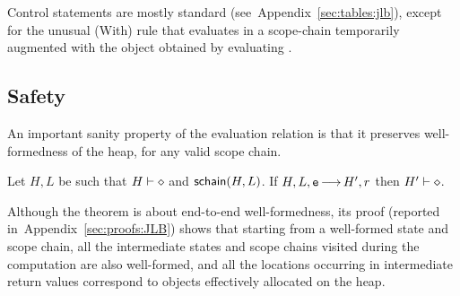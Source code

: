 \documentclass{article}
\newcommand{\iflong}[1]{#1}
\newcommand{\ifshort}[1]{}
\begin{document}
Control statements are mostly standard (see~\ifshort{\cite{proofs}}\iflong{Appendix~\ref{sec:tables:jlb}}),
except for the unusual (With) rule that evaluates  in a
scope-chain temporarily augmented with the object obtained by evaluating .
% 


\subsection{Safety}

An important sanity property of the evaluation relation is that it preserves well-formedness of the heap, for any valid scope chain.
%
\begin{thm}\label{thoerem:anotherwfheap1}
Let $H,L$ be such that $H\vdash\diamond$ and $\mathsf{schain}(H,L)$. 
If $H,L,\mbox{\texttt{{\upshape e}}}{\,\longrightarrow\,} H',r$ then $H'\vdash\diamond$. 
\end{thm}
%
Although the theorem is about end-to-end well-formedness, its proof (reported in~\ifshort{\cite{proofs}}\iflong{Appendix~\ref{sec:proofs:JLB}}) shows that starting from a well-formed state and scope chain, all the intermediate states and scope chains visited during the computation are also well-formed, and all the locations occurring in intermediate return values correspond to objects effectively allocated on the heap.
%
  














\end{document}
